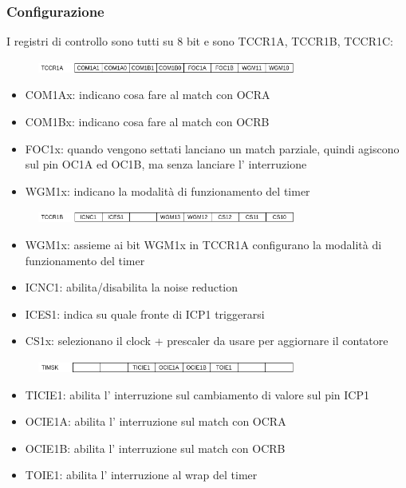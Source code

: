 \subsubsection{Configurazione}
I registri di controllo sono tutti su 8 bit e sono TCCR1A, TCCR1B, TCCR1C:
\begin{figure}[H]
    \centering
    \includegraphics[width=320px]{images/18_Timer/TCCR1A.png}
\end{figure}
\begin{itemize}
    \item COM1Ax: indicano cosa fare al match con OCRA
    \item COM1Bx: indicano cosa fare al match con OCRB
    \item FOC1x: quando vengono settati lanciano un match parziale, quindi agiscono sul pin OC1A ed OC1B, ma senza lanciare l' interruzione
    \item WGM1x: indicano la modalità di funzionamento del timer
\end{itemize}

\begin{figure}[H]
    \centering
    \includegraphics[width=320px]{images/18_Timer/TCCR1B.png}
\end{figure}
\begin{itemize}
    \item WGM1x: assieme ai bit WGM1x in TCCR1A configurano la modalità di funzionamento del timer
    \item ICNC1: abilita/disabilita la noise reduction
    \item ICES1: indica su quale fronte di ICP1 triggerarsi
    \item CS1x: selezionano il clock + prescaler da usare per aggiornare il contatore
\end{itemize}

\begin{figure}[H]
    \centering
    \includegraphics[width=320px]{images/18_Timer/TIMSK_1.png}
\end{figure}
\begin{itemize}
    \item TICIE1: abilita l' interruzione sul cambiamento di valore sul pin ICP1
    \item OCIE1A: abilita l' interruzione sul match con OCRA
    \item OCIE1B: abilita l' interruzione sul match con OCRB
    \item TOIE1: abilita l' interruzione al wrap del timer
\end{itemize}

